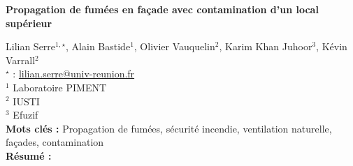 


    \newpage


%
\begin{flushleft}
\addtocounter{section}{1}
{\Large \textbf{Propagation de fumées en façade avec contamination d'un local supérieur}}\label{ref:50}
\end{flushleft}
%
Lilian Serre$^{1,\star}$, Alain Bastide$^{1}$, Olivier Vauquelin$^{2}$, Karim Khan Juhoor$^{3}$, Kévin Varrall$^{2}$\\[2mm]
$^{\star}$ \Letter : \url{lilian.serre@univ-reunion.fr}\\[2mm]
{\footnotesize $^{1}$ Laboratoire PIMENT}\\
{\footnotesize $^{2}$ IUSTI}\\
{\footnotesize $^{3}$ Efuzif}\\
[4mm]
%
\noindent \textbf{Mots clés : } Propagation de fumées, sécurité incendie, ventilation naturelle, façades, contamination\\[4mm]
%
\noindent \textbf{Résumé : } 

